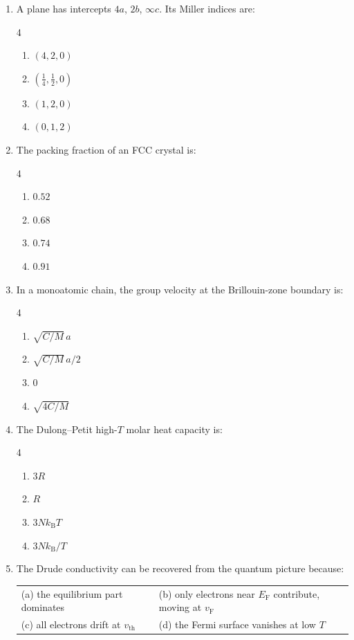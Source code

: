 \documentclass[11pt,a4paper]{article}
\newcommand{\kB}{k_{\mathrm{B}}}
\newcommand{\EF}{E_{\mathrm{F}}}
\begin{document}
\begin{enumerate}[leftmargin=*,itemsep=6pt,series=questions]

\item A plane has intercepts $4a$, $2b$, $\infty c$. Its Miller indices are:
\begin{multicols}{4}
\begin{enumerate}[label=(\alph*)]
\item $(4,2,0)$
\item $(\tfrac{1}{4},\tfrac{1}{2},0)$
\item $(1,2,0)$
\item $(0,1,2)$
\end{enumerate}
\end{multicols}

\item The packing fraction of an FCC crystal is:
\begin{multicols}{4}
\begin{enumerate}[label=(\alph*)]
\item $0.52$
\item $0.68$
\item $0.74$
\item $0.91$
\end{enumerate}
\end{multicols}

\item In a monoatomic chain, the group velocity at the Brillouin-zone boundary is:
\begin{multicols}{4}
\begin{enumerate}[label=(\alph*)]
\item $\sqrt{C/M}\,a$
\item $\sqrt{C/M}\,a/2$
\item $0$
\item $\sqrt{4C/M}$
\end{enumerate}
\end{multicols}

\item The Dulong--Petit high-$T$ molar heat capacity is:
\begin{multicols}{4}
\begin{enumerate}[label=(\alph*)]
\item $3R$
\item $R$
\item $3N\kB T$
\item $3N\kB/T$
\end{enumerate}
\end{multicols}

\item The Drude conductivity can be recovered from the quantum picture because:
\begin{center}
\begin{tabular}{@{}p{}@{\qquad}p{}@{}}
(a) the equilibrium part dominates &
(b) only electrons near $\EF$ contribute, moving at $v_{\mathrm{F}}$ \\[6pt]
(c) all electrons drift at $v_{\mathrm{th}}$ &
(d) the Fermi surface vanishes at low $T$
\end{tabular}
\end{center}

\end{enumerate}
\end{document}
